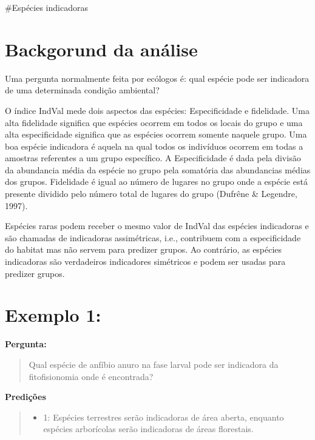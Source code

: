 \documentclass[
]{book}
\providecommand{\tightlist}{%
  \setlength{\itemsep}{0pt}\setlength{\parskip}{0pt}}
\begin{document}
\#Espécies indicadoras

\hypertarget{backgorund-da-anuxe1lise-2}{%
\section{Backgorund da análise}\label{backgorund-da-anuxe1lise-2}}

Uma pergunta normalmente feita por ecólogos é: qual espécie pode ser indicadora de uma determinada condição ambiental?

O índice IndVal mede dois aspectos das espécies: Especificidade e fidelidade. Uma alta fidelidade significa que espécies ocorrem em todos os locais do grupo e uma alta especificidade significa que as espécies ocorrem somente naquele grupo. Uma boa espécie indicadora é aquela na qual todos os indivíduos ocorrem em todas a amostras referentes a um grupo específico.
A Especificidade é dada pela divisão da abundancia média da espécie no grupo pela somatória das abundancias médias dos grupos. Fidelidade é igual ao número de lugares no grupo onde a espécie está presente dividido pelo número total de lugares do grupo (Dufrêne \& Legendre, 1997).

Espécies raras podem receber o mesmo valor de IndVal das espécies indicadoras e são chamadas de indicadoras assimétricas, i.e., contribuem com a especificidade do habitat mas não servem para predizer grupos. Ao contrário, as espécies indicadoras são verdadeiros indicadores simétricos e podem ser usadas para predizer grupos.

\hypertarget{exemplo-1-2}{%
\section{Exemplo 1:}\label{exemplo-1-2}}

\textbf{Pergunta:}

\begin{quote}
Qual espécie de anfíbio anuro na fase larval pode ser indicadora da fitofisionomia onde é encontrada?
\end{quote}

\textbf{Predições}

\begin{quote}
\begin{itemize}
\tightlist
\item
  1: Espécies terrestres serão indicadoras de área aberta, enquanto espécies arborícolas serão indicadoras de áreas florestais.
\end{itemize}
\end{quote}
\end{document}
